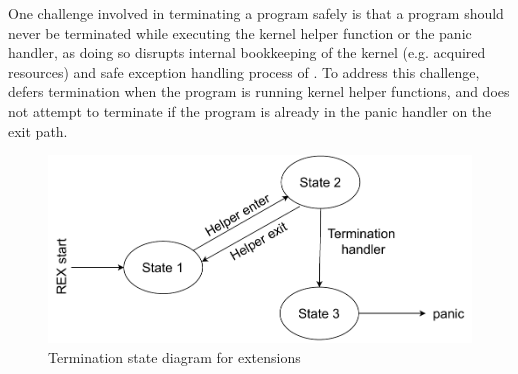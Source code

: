 One challenge involved in terminating a \projname{} program safely is that a
    program should never be terminated while executing the kernel helper
    function or the panic handler, as doing so disrupts internal bookkeeping of
    the kernel (e.g. acquired resources) and safe exception handling process of
    \projname{}.
To address this challenge, \projname{} defers termination when the program is
    running kernel helper functions, and does not attempt to terminate if the
    program is already in the panic handler on the exit path.

\begin{figure}
    \includegraphics[width=1.0\linewidth]{figs/BPF_termination_state_diagram.pdf}
    \centering
    \caption{Termination state diagram for \projname{} extensions}
    \label{fig:rex-termination}
\end{figure}

